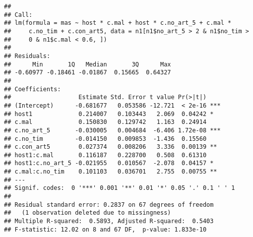 \documentclass[]{article}
\newenvironment{Shaded}{\begin{snugshade}}{\end{snugshade}}
\newcommand{\KeywordTok}[1]{\textcolor[rgb]{0.13,0.29,0.53}{\textbf{#1}}}
\newcommand{\DataTypeTok}[1]{\textcolor[rgb]{0.13,0.29,0.53}{#1}}
\newcommand{\DecValTok}[1]{\textcolor[rgb]{0.00,0.00,0.81}{#1}}
\newcommand{\StringTok}[1]{\textcolor[rgb]{0.31,0.60,0.02}{#1}}
\newcommand{\OperatorTok}[1]{\textcolor[rgb]{0.81,0.36,0.00}{\textbf{#1}}}
\newcommand{\NormalTok}[1]{#1}
\begin{document}
\begin{verbatim}
## 
## Call:
## lm(formula = mas ~ host * c.mal + host * c.no_art_5 + c.mal * 
##     c.no_tim + c.con_art5, data = n1[n1$no_art_5 > 2 & n1$no_tim > 
##     0 & n1$c.mal < 0.6, ])
## 
## Residuals:
##      Min       1Q   Median       3Q      Max 
## -0.60977 -0.18461 -0.01867  0.15665  0.64327 
## 
## Coefficients:
##                   Estimate Std. Error t value Pr(>|t|)    
## (Intercept)      -0.681677   0.053586 -12.721  < 2e-16 ***
## host1             0.214007   0.103443   2.069  0.04242 *  
## c.mal             0.150830   0.129742   1.163  0.24914    
## c.no_art_5       -0.030005   0.004684  -6.406 1.72e-08 ***
## c.no_tim         -0.014150   0.009853  -1.436  0.15560    
## c.con_art5        0.027374   0.008206   3.336  0.00139 ** 
## host1:c.mal       0.116187   0.228700   0.508  0.61310    
## host1:c.no_art_5 -0.021955   0.010567  -2.078  0.04157 *  
## c.mal:c.no_tim    0.101103   0.036701   2.755  0.00755 ** 
## ---
## Signif. codes:  0 '***' 0.001 '**' 0.01 '*' 0.05 '.' 0.1 ' ' 1
## 
## Residual standard error: 0.2837 on 67 degrees of freedom
##   (1 observation deleted due to missingness)
## Multiple R-squared:  0.5893, Adjusted R-squared:  0.5403 
## F-statistic: 12.02 on 8 and 67 DF,  p-value: 1.833e-10
\end{verbatim}

\begin{Shaded}
\end{Shaded}
\end{document}
